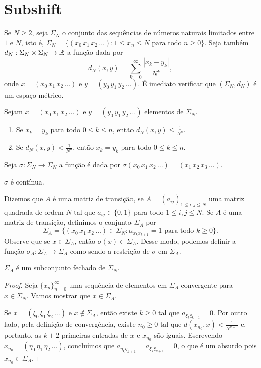 \section{Subshift}

Se $N \geq 2$, seja $\Sigma_N$ o conjunto das sequências de números naturais limitados entre $1$ e $N$, isto é, $\Sigma_N = \lbrace (x_0 \, x_1 \, x_2 \, \dots) : 1 \leq x_n \leq N  \text{ para todo } n \geq 0 \rbrace$.
Seja também $d_N : \Sigma_N \times \Sigma_N \to \mathbb{R}$ a função dada por
$$d_N(x, y) = \sum_{k=0}^\infty \frac{|x_k - y_k|}{N^k},$$
onde $x = (x_0 \, x_1 \, x_2 \, \dots)$ e $y = (y_0 \, y_1 \, y_2 \, \dots)$.
É imediato verificar que $(\Sigma_N, d_N)$ é um espaço métrico.

\begin{proposition}
Sejam $x = (x_0 \, x_1 \, x_2 \, \dots)$ e $y = (y_0 \, y_1 \, y_2 \, \dots)$ elementos de $\Sigma_N$.
\begin{enumerate}
\item Se $x_k = y_k$ para todo $0 \leq k \leq n$, então $d_N(x, y) \leq \frac{1}{N^n}$.
\item Se $d_N(x, y) < \frac{1}{N^n}$, então $x_k = y_k$ para todo $0 \leq k \leq n$.
\end{enumerate}
\end{proposition}

Seja $\sigma: \Sigma_N \to \Sigma_N$ a função é dada por $\sigma(x_0 \, x_1 \, x_2 \, \dots) = (x_1 \, x_2 \, x_3 \, \dots)$.
\begin{proposition}
$\sigma$ é contínua.
\end{proposition}

Dizemos que $A$ é uma matriz de transição, se $A = (a_{ij})_{1 \leq i,j \leq N}$ uma matriz quadrada de ordem $N$ tal que $a_{ij} \in \lbrace 0, 1 \rbrace$ para todo $1 \leq i,j \leq N$.
Se $A$ é uma matriz de transição, definimos o conjunto $\Sigma_A$ por
$$\Sigma_A = \lbrace (x_0 \, x_1 \, x_2 \, \dots) \in \Sigma_N : a_{x_k x_{k+1}} = 1 \text{ para todo } k \geq 0 \rbrace.$$
Observe que se $x \in \Sigma_A$, então $\sigma(x) \in \Sigma_A$.
Desse modo, podemos definir a função $\sigma_A: \Sigma_A \to \Sigma_A$ como sendo a restrição de $\sigma$ em $\Sigma_A$.

\begin{proposition}
$\Sigma_A$ é um subconjunto fechado de $\Sigma_N$.
\end{proposition}

\begin{proof}
Seja $\lbrace x_n \rbrace_{n=0}^{\infty}$ uma sequência de elementos em $\Sigma_A$ convergente para $x \in \Sigma_N$.
Vamos mostrar que $x \in \Sigma_A$.

Se $x = (\xi_0 \, \xi_1 \, \xi_2 \, \dots)$ e $x \notin \Sigma_A$, então existe $k \geq 0$ tal que $a_{\xi_k \xi_{k+1}} = 0$. Por outro lado, pela definição de convergência, existe $n_0 \geq 0$ tal que $d(x_{n_0}, x) < \frac{1}{N^{k+1}}$ e, portanto, as $k+2$ primeiras entradas de $x$ e $x_{n_0}$ são iguais. Escrevendo $x_{n_0} = (\eta_0 \, \eta_1 \, \eta_2 \, \dots)$, concluímos que $a_{\eta_k \eta_{k+1}} = a_{\xi_k \xi_{k+1}} = 0$, o que é um absurdo pois $x_{n_0} \in \Sigma_A$.
\end{proof}

